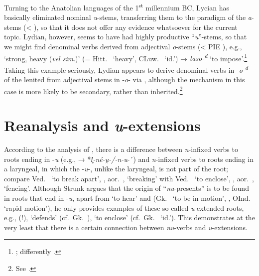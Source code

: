\documentclass[output=paper,colorlinks,citecolor=brown]{langscibook}
\begin{document}
Turning to the Anatolian languages of the 1\textsuperscript{st} millennium BC, Lycian has basically eliminated nominal \textit{u}-stems, transferring them to the paradigm of the \textit{a}-stems (< ), so that it does not offer any evidence whatsoever for the current topic. Lydian, however, seems to have had highly productive ``\textit{u}''-stems, so that we might find denominal verbs  derived from adjectival \textit{o}-stems (< PIE ), e.g.,  ‘strong, heavy (\textit{vel sim}.)’ (= Hitt.\  ‘heavy’, CLuw.\  ‘id.’) → \textit{taso-\textsuperscript{d}}  ‘to impose’.\footnote{\citealt[180--190]{Sasseville2021}; differently \citealt[174, fn.\ 20]{GarnierSagot2020}.} Taking this example seriously, Lydian appears to derive denominal verbs in -\textit{o-\textsuperscript{d}} of the lenited  from adjectival stems in -\textit{o}- via , although the mechanism in this case is more likely to be secondary, rather than inherited.\footnote{See \citealt[203--205]{Sasseville2021}.}

\section{Reanalysis and \textit{u}-extensions}
\label{sec:u-ext}

According to the analysis of \citet[60--108]{Strunk1967}, there is a difference between \textit{n}-infixed verbs to roots ending in -\textit{u} (e.g.,  → *\textit{\kinvbreve l̥-né-u̯-/-n-u}-´) and \textit{n}-infixed verbs to roots ending in a laryngeal, in which the -\textit{u}-, unlike the laryngeal, is not part of the root; compare Ved.\  ‘to break apart’, , aor.\ ,  ‘breaking’ with Ved.\  ‘to enclose’‚ , aor.\ ,  ‘fencing’. Although Strunk argues that the origin of “\textit{nu}-presents”  is to be found in roots that end in -\textit{u},  apart from  ‘to hear’ and  (Gk.\   ‘to be in motion’, , OInd.\  ‘rapid motion’), he only provides examples of these so-called \textit{u}-extended roots, e.g.,  (!),  ‘defends’ (cf.\ Gk.\ ),  ‘to enclose’ (cf.\ Gk.\  ‘id.’).  This demonstrates at the very least that there is a certain connection between \textit{nu}-verbs and \textit{u}-extensions.
\end{document}

